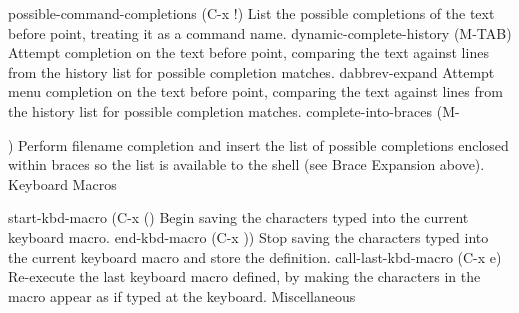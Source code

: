 possible-command-completions (C-x !)
List the possible completions of the text before point, treating it as a command name.
dynamic-complete-history (M-TAB)
Attempt completion on the text before point, comparing the text against lines from the history list for possible completion matches.
dabbrev-expand
Attempt menu completion on the text before point, comparing the text against lines from the history list for possible completion matches.
complete-into-braces (M-{)
Perform filename completion and insert the list of possible completions enclosed within braces so the list is available to the shell (see Brace Expansion above).
Keyboard Macros

start-kbd-macro (C-x ()
Begin saving the characters typed into the current keyboard macro.
end-kbd-macro (C-x ))
Stop saving the characters typed into the current keyboard macro and store the definition.
call-last-kbd-macro (C-x e)
Re-execute the last keyboard macro defined, by making the characters in the macro appear as if typed at the keyboard.
Miscellaneous

}
